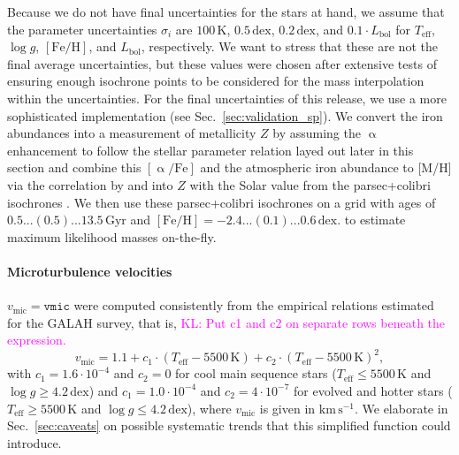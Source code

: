 \documentclass[fleqn,usenatbib,useAMS]{mnras}
\newcommand{\Teff}{$T_\mathrm{eff}$\xspace}
\newcommand{\logg}{$\log g$\xspace}
\newcommand{\feh}{$\mathrm{[Fe/H]}$\xspace}
\newcommand{\vmic}{$v_\mathrm{mic}$\xspace}
\newcommand{\lbol}{$L_\mathrm{bol}$\xspace}
\newcommand\KL[1]{\textcolor{magenta}{KL: #1}}
\begin{document}
Because we do not have final uncertainties for the stars at hand, we assume that the parameter uncertainties $\sigma_i$ are $100\,\mathrm{K}$, $0.5\,\mathrm{dex}$, $0.2\,\mathrm{dex}$, and $0.1\cdot L_\text{bol}$ for \Teff, \logg, \feh, and \lbol, respectively. We want to stress that these are not the final average uncertainties, but these values were chosen after extensive tests of ensuring enough isochrone points to be considered for the mass interpolation within the uncertainties. For the final uncertainties of this release, we use a more sophisticated implementation (see Sec.~\ref{sec:validation_sp}). We convert the iron abundances into a measurement of metallicity $Z$ by assuming the $\upalpha$ enhancement to follow the stellar parameter relation layed out later in this section and combine this $\mathrm{[\upalpha/Fe]}$ and the atmospheric iron abundance to [M/H] via the correlation by \citet{Salaris2005} and into $Z$ with the Solar value from the {\sc parsec+colibri} isochrones \citep{Bressan2012, Marigo2017}. We then use these {\sc parsec+colibri} isochrones on a grid with ages of $0.5...(0.5)...13.5\,\mathrm{Gyr}$ and $\mathrm{[Fe/H]} = -2.4...(0.1)...0.6\,\mathrm{dex}$. to estimate maximum likelihood masses on-the-fly.

\paragraph*{Microturbulence velocities} $v_\mathrm{mic} = \texttt{vmic}$ were computed consistently from the empirical relations estimated for the GALAH survey, that is,
\KL{Put c1 and c2 on separate rows beneath the expression.}
\begin{equation}
v_\mathrm{mic} = 1.1 + c_1 \cdot (T_\mathrm{eff}-5500\,\mathrm{K}) + c_2 \cdot (T_\mathrm{eff}-5500\,\mathrm{K})^2,
\end{equation}
with $c_1 =1.6 \cdot 10^{-4}$ and $c_2 = 0$ for cool main sequence stars ($T_\mathrm{eff} \leq 5500\,\mathrm{K}$ and $\log g \geq 4.2\,\mathrm{dex}$) and $c_1 =1.0 \cdot 10^{-4}$ and $c_2 = 4 \cdot 10^{-7}$ for evolved and hotter stars ($T_\textrm{eff} \geq 5500\,\mathrm{K}$ and $\log g \leq 4.2\,\mathrm{dex}$), where \vmic is given in $\mathrm{km\,s^{-1}}$. We elaborate in Sec.~\ref{sec:caveats} on possible systematic trends that this simplified function could introduce.
\end{document}
